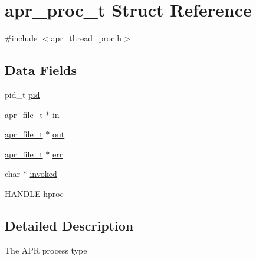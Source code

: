 \hypertarget{structapr__proc__t}{\section{apr\-\_\-proc\-\_\-t Struct Reference}
\label{structapr__proc__t}
}


{\ttfamily \#include $<$apr\-\_\-thread\-\_\-proc.\-h$>$}

\subsection*{Data Fields}
\begin{DoxyCompactItemize}
\item 
pid\-\_\-t \hyperlink{structapr__proc__t_a8a8ee4b234156485a72497023e7482e5}{pid}
\item 
\hyperlink{group__apr__file__io_gaa46e4763ac375ea3c7a43ba6f6099e22}{apr\-\_\-file\-\_\-t} $\ast$ \hyperlink{structapr__proc__t_a914bda8939f9d17c9e2f238683fb994b}{in}
\item 
\hyperlink{group__apr__file__io_gaa46e4763ac375ea3c7a43ba6f6099e22}{apr\-\_\-file\-\_\-t} $\ast$ \hyperlink{structapr__proc__t_acb7d7c5226217946d761f0e90ff70d24}{out}
\item 
\hyperlink{group__apr__file__io_gaa46e4763ac375ea3c7a43ba6f6099e22}{apr\-\_\-file\-\_\-t} $\ast$ \hyperlink{structapr__proc__t_ad087f812b5c69ce937db4cf6e8cd5a0b}{err}
\item 
char $\ast$ \hyperlink{structapr__proc__t_a72ed1c58c3f08ffa7202fa80e870cd54}{invoked}
\item 
H\-A\-N\-D\-L\-E \hyperlink{structapr__proc__t_aa1f17cce2b442d92893b9c63053b6771}{hproc}
\end{DoxyCompactItemize}


\subsection{Detailed Description}
The A\-P\-R process type 

